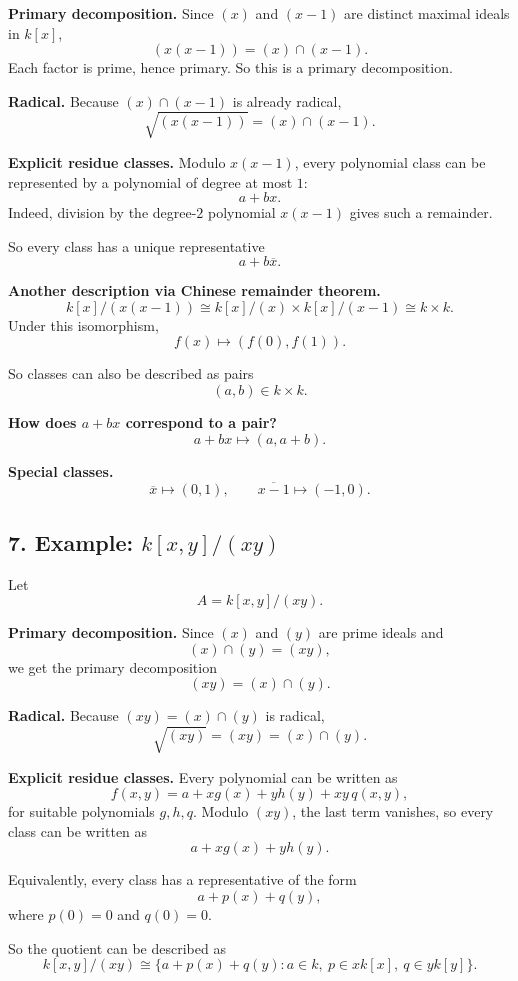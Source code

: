 \documentclass[12pt,a4paper]{article}
\theoremstyle{notespace}
\begin{document}
\textbf{Primary decomposition.}
Since \((x)\) and \((x-1)\) are distinct maximal ideals in \(k[x]\),
\[
(x(x-1))=(x)\cap(x-1).
\]
Each factor is prime, hence primary.
So this is a primary decomposition.

\textbf{Radical.}
Because \((x)\cap(x-1)\) is already radical,
\[
\sqrt{(x(x-1))}=(x)\cap(x-1).
\]

\textbf{Explicit residue classes.}
Modulo \(x(x-1)\), every polynomial class can be represented by a polynomial of degree at most \(1\):
\[
a+bx.
\]
Indeed, division by the degree-\(2\) polynomial \(x(x-1)\) gives such a remainder.

So every class has a unique representative
\[
a+b\overline x.
\]

\textbf{Another description via Chinese remainder theorem.}
\[
k[x]/(x(x-1))\cong k[x]/(x)\times k[x]/(x-1)\cong k\times k.
\]
Under this isomorphism,
\[
f(x)\longmapsto (f(0),f(1)).
\]

So classes can also be described as pairs
\[
(a,b)\in k\times k.
\]

\textbf{How does \(a+bx\) correspond to a pair?}
\[
a+bx \longmapsto (a,a+b).
\]

\textbf{Special classes.}
\[
\overline x \longmapsto (0,1),\qquad \overline{x-1}\longmapsto (-1,0).
\]

\subsection{7. Example: \(k[x,y]/(xy)\)}

Let
\[
A=k[x,y]/(xy).
\]

\textbf{Primary decomposition.}
Since \((x)\) and \((y)\) are prime ideals and
\[
(x)\cap(y)=(xy),
\]
we get the primary decomposition
\[
(xy)=(x)\cap(y).
\]

\textbf{Radical.}
Because \((xy)=(x)\cap(y)\) is radical,
\[
\sqrt{(xy)}=(xy)=(x)\cap(y).
\]

\textbf{Explicit residue classes.}
Every polynomial can be written as
\[
f(x,y)=a + xg(x) + yh(y) + xy\,q(x,y),
\]
for suitable polynomials \(g,h,q\).
Modulo \((xy)\), the last term vanishes, so every class can be written as
\[
a + xg(x) + yh(y).
\]

Equivalently, every class has a representative of the form
\[
a + p(x) + q(y),
\]
where \(p(0)=0\) and \(q(0)=0\).

So the quotient can be described as
\[
k[x,y]/(xy)\cong \{a+p(x)+q(y):a\in k,\ p\in xk[x],\ q\in yk[y]\}.
\]
\end{document}
